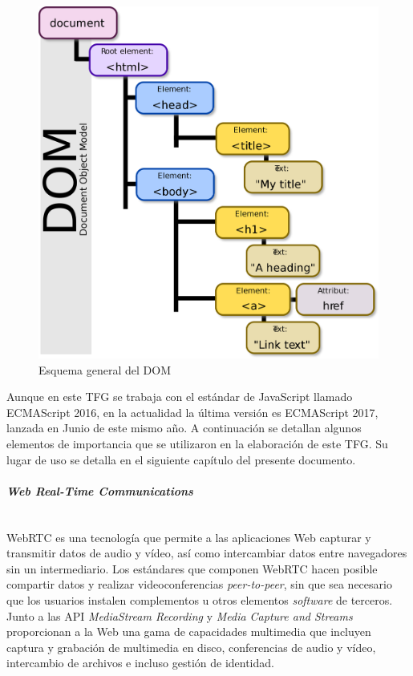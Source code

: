 \begin{figure}[!t]
\begin{center}
\includegraphics[width=0.75\linewidth]{./3_Tecnologias/Img/DOMModel.png}
\end{center}
\caption{Esquema general del DOM}
\label{DOMModel}
\end{figure}

Aunque en este TFG se trabaja con el estándar de JavaScript llamado ECMAScript 2016, en la actualidad la última versión es ECMAScript 2017, lanzada en Junio de este mismo año. A continuación se detallan algunos elementos de importancia que se utilizaron en la elaboración de este TFG. Su lugar de uso se detalla en el siguiente capítulo del presente documento.

\paragraph{\emph{Web Real-Time Communications}}~\\

WebRTC es una tecnología que permite a las aplicaciones Web capturar y transmitir datos de audio y vídeo, así como intercambiar datos entre navegadores sin un intermediario. Los estándares que componen WebRTC hacen posible compartir datos y realizar videoconferencias \emph{peer-to-peer}, sin que sea necesario que los usuarios instalen complementos u otros elementos \emph{software} de terceros. Junto a las API \emph{MediaStream Recording} y \emph{Media Capture and Streams} proporcionan a la Web una gama de capacidades multimedia que incluyen captura y grabación de multimedia en disco, conferencias de audio y vídeo, intercambio de archivos e incluso gestión de identidad.

